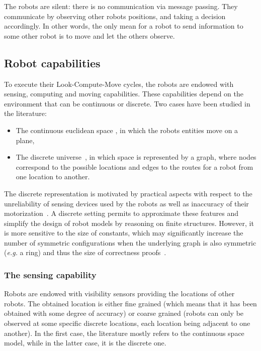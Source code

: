 The robots are silent: there is no communication via message passing.
They communicate by observing other robots positions, and taking a decision accordingly. In other words, the only mean for a robot to send information to some other robot is to move and let the others observe.


\subsection{Robot capabilities}
To execute their Look-Compute-Move cycles, the robots are endowed with sensing, computing and moving capabilities. These capabilities 
depend on the environment that can be continuous or discrete.
Two cases have been studied in the literature: 
\begin{itemize}
\item The continuous euclidean space \cite{suzuki_distributed_1999,FPS12}, in which the robots entities move on a plane, 
\item The discrete universe~\cite{KlasingMP06,flocchini_computing_2007}, in which space is represented by a graph, where nodes correspond to the possible locations and edges to the routes for a robot from one location to another.
\end{itemize}
The discrete representation is motivated by practical aspects with respect to the unreliability of sensing devices used by the robots as well as inaccuracy of their motorization~\cite{CDDMJ08j}.  A discrete setting permits to approximate these features and simplify the design of robot models by reasoning on finite structures. However, it is more sensitive to the size of constants, which may significantly increase the number of symmetric configurations 
when the underlying graph is also symmetric (\emph{e.g.} a ring) and thus the size of correctness proofs~\cite{ASN11c, KLOT11, KLOT12}.


\subsubsection{The sensing capability}
 Robots are endowed with visibility sensors providing the locations of other robots. The obtained location is either fine grained (which means that it has been obtained with some degree of accuracy) or coarse grained (robots can only be observed at some specific discrete locations, each location being adjacent to one another). In the first case, the literature mostly refers to the continuous space model, while in the latter case, it is the discrete one.
 
